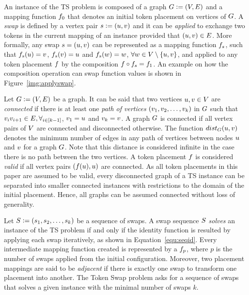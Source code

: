 \documentclass[msc,english,table,xcdraw]{ppgccufmg}
\begin{document}

An instance of the TS problem is composed of a graph $G \vcentcolon= (V,E)$ and a mapping function $f_{0}$ that denotes an initial 
token placement on vertices of $G$.
A \textit{swap} is defined by a vertex pair $s \vcentcolon= (u,
v)$ and it can be \textit{applied} to exchange two tokens in the current 
mapping of an instance provided that $(u,
v) \in E$.
More formally, any swap $s = (u,v)$ can be 
represented as a mapping function $f_s$, such that $f_s(u) = v$, $f_s(v) = u$ and $f_s(w) = w$, $\forall w \in V\setminus \{u,v\}$, and 
applied to any token placement $f$ by the composition $f\circ
f_s = f_1$.
An example on how the composition operation can swap function values is shown
in Figure~\ref{img:applyswap}.

Let $G \vcentcolon= (V,E)$ be a graph.
It can be said that two vertices $u, v \in V$ are 
\textit{connected} if there is at least one \textit{path of vertices} 
$(v_1, v_2, \ldots, v_k)$ in $G$ such that 
$v_{i}v_{i+1} \in E, \forall_{i\in[k-1]}$, 
$v_{1} = u$ and $v_{k} = v$.
A graph $G$ is connected if all vertex pairs of $V$ are 
connected and disconnected otherwise.
The function $dist_{G}(u, v)$ denotes the minimum number of edges in 
any path of vertices between nodes $u$ and $v$ for a graph 
$G$.
Note that this distance is considered infinite in the case there is no 
path between the two vertices.
A token placement $f$ is considered \textit{valid} if all vertex pairs
$(f(u), u)$ are connected.
As all token placements in this paper are assumed to be valid, every 
disconnected graph of a TS instance can be separated into smaller connected 
instances with restrictions to the domain of the initial placement.
Hence, all graphs can be assumed connected without loss of generality.

Let $S \vcentcolon= (s_1, s_2, \ldots, s_k)$ be a 
sequence of swaps.
A swap sequence $S$ \textit{solves} an instance of the TS problem if and 
only if the identity function is resulted by applying each swap iteratively, as 
shown in Equation~\ref{equ:seqid}. 
Every intermediate mapping function created is represented by a $f_p$, 
where $p$ is the number of swaps applied from the initial configuration.
Moreover, two placement mappings are said to be \textit{adjacent} if there is 
exactly one swap to transform one placement into another.
The Token Swap problem asks for a sequence of swaps that solves a given 
instance with the minimal number of swaps $k$.
\end{document}
